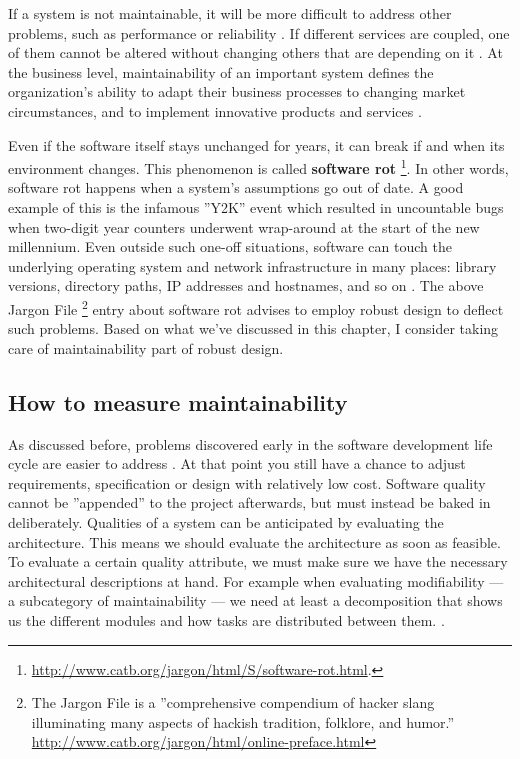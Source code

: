 \documentclass[utf8,english]{gradu3}
\begin{document}
If a system is not maintainable, it will be more difficult to address other
problems, such as performance or reliability \parencite[46]{Bouwers2010}. If different
services are coupled, one of them cannot be altered without changing others that
are depending on it \parencite[2]{Vale2022}. At the business level, maintainability of an
important system defines the organization's ability to adapt their business
processes to changing market circumstances, and to implement innovative products
and services \parencite[21]{Broy2006}.

Even if the software itself stays unchanged for years, it can break if and when
its environment changes. This phenomenon is called \textbf{software rot}
\footnote{\url{http://www.catb.org/jargon/html/S/software-rot.html}.}.
In other words, software rot happens when a system's assumptions
go out of date. A good example of this is the infamous ''Y2K'' event which
resulted in uncountable bugs when two-digit year counters underwent wrap-around
at the start of the new millennium. Even outside such one-off
situations, software can touch the underlying operating system and network
infrastructure in many places: library versions, directory paths, IP addresses
and hostnames, and so on \parencite{Heroku2011}. The above Jargon File \footnote{The Jargon
  File is a ''comprehensive compendium of hacker slang illuminating many aspects
  of hackish tradition, folklore, and humor.''
  \url{http://www.catb.org/jargon/html/online-preface.html}} entry about software
rot advises to employ robust design to deflect such problems. Based on what
we've discussed in this chapter, I consider taking care of maintainability part
of robust design.


\subsection{How to measure maintainability}

As discussed before, problems discovered early in the software development life
cycle are easier to address \parencite{Bass1998}. At that point you still have a chance to
adjust requirements, specification or design with relatively low cost. Software
quality cannot be ''appended'' to the project afterwards, but must instead be baked in
deliberately. Qualities of a system can be anticipated by evaluating the
architecture. This means we should evaluate the architecture as soon as
feasible. To evaluate a certain quality attribute, we must make sure we have the
necessary architectural descriptions at hand. For example when evaluating
modifiability --- a subcategory of maintainability --- we need at least a
decomposition that shows us the different modules and how tasks are distributed
between them. \parencite[32, 190-191]{Bass1998}.
\end{document}
